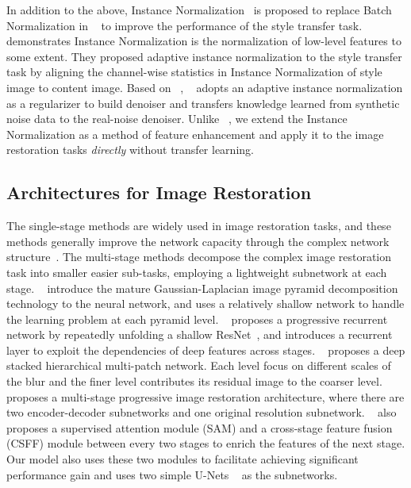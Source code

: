 \documentclass[final]{cvpr}
\begin{document}
In addition to the above, Instance Normalization~\cite{ulyanov2016instance} is proposed to replace Batch Normalization in ~\cite{ulyanov2016texture} to improve the performance of the style transfer task. ~\cite{huang2017arbitrary} demonstrates Instance Normalization is the normalization of low-level features to some extent. They proposed adaptive instance normalization to the style transfer task by aligning the channel-wise statistics in Instance Normalization of style image to content image. Based on ~\cite{huang2017arbitrary}, ~\cite{kim2020transfer} adopts an adaptive instance normalization as a regularizer to build denoiser and transfers knowledge learned from synthetic noise data to the real-noise denoiser.
Unlike ~\cite{kim2020transfer}, we extend the Instance Normalization as a method of feature enhancement and apply it to the image restoration tasks \emph{directly} without transfer learning. 

\subsection{Architectures for Image Restoration }

The single-stage methods are widely used in image restoration tasks, and these methods generally improve the network capacity through the complex network structure~\cite{anwar2020densely, zhang2018density}. The multi-stage methods decompose the complex image restoration task into smaller easier sub-tasks, employing a lightweight subnetwork at each stage. ~\cite{fu2019lightweight} introduce the mature Gaussian-Laplacian image pyramid decomposition technology to the neural network, and uses a relatively shallow network to handle the learning problem at each pyramid level. ~\cite{ren2019progressive} proposes a progressive recurrent network by repeatedly unfolding a shallow ResNet~\cite{he2016deep}, and introduces a recurrent layer to exploit the dependencies of deep features across stages. ~\cite{zhang2019deep} proposes a deep stacked hierarchical multi-patch network. Each level focus on different scales of the blur and the finer level contributes its residual image to the coarser level. ~\cite{zamir2021multi} proposes a multi-stage progressive image restoration architecture, where there are two encoder-decoder subnetworks and one original resolution subnetwork. ~\cite{zamir2021multi} also proposes a supervised attention module (SAM) and a cross-stage feature fusion (CSFF) module between every two stages to enrich the features of the next stage. Our model also uses these two modules to facilitate achieving significant performance gain and uses two simple U-Nets ~\cite{ronneberger2015u} as the subnetworks.
\end{document}
